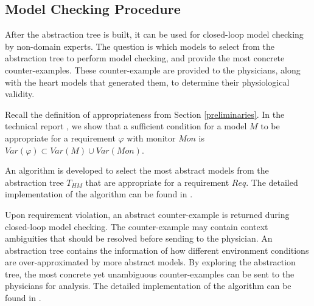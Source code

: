 \subsection{Model Checking Procedure}
After the abstraction tree is built, it can be used for closed-loop model checking by non-domain experts. 
The question is which models to select from the abstraction tree to perform model checking, and provide the most concrete counter-examples.
These counter-example are provided to the physicians, along with the heart models that generated them, to determine their physiological validity.

Recall the definition of appropriateness from Section \ref{preliminaries}.
In the technical report \cite{regar_tech}, we show that a sufficient condition for a model $M$ to be appropriate for a requirement $\varphi$ with monitor $Mon$ is
$Var(\varphi) \subset Var(M) \cup Var(Mon)$.

An algorithm is developed to select the most abstract models from the abstraction tree $T_{HM}$ that are appropriate for a requirement $Req$. The detailed implementation of the algorithm can be found in \cite{regar_tech}.

Upon requirement violation, an abstract counter-example is returned during closed-loop model checking. The counter-example may contain context ambiguities that should be resolved before sending to the physician. An abstraction tree contains the information of how different environment conditions are over-approximated by more abstract models. By exploring the abstraction tree, the most concrete yet unambiguous counter-examples can be sent to the physicians for analysis. The detailed implementation of the algorithm can be found in \cite{regar_tech}.%


